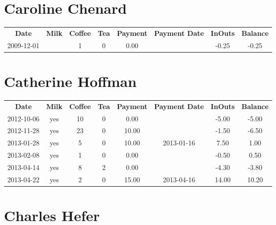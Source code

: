 \section{Caroline Chenard}

\begin{center}
\begin{tabular}{cccccccc}
\textbf{Date} & \textbf{Milk} & \textbf{Coffee} & \textbf{Tea} & \textbf{Payment} & \textbf{Payment Date} & \textbf{InOuts} & \textbf{Balance} \\
2009-12-01 &  & 1 & 0 & 0.00 &  & -0.25 & -0.25
\end{tabular}
\end{center}

\section{Catherine Hoffman}

\begin{center}
\begin{tabular}{cccccccc}
\textbf{Date} & \textbf{Milk} & \textbf{Coffee} & \textbf{Tea} & \textbf{Payment} & \textbf{Payment Date} & \textbf{InOuts} & \textbf{Balance} \\
2012-10-06 & yes & 10 & 0 &  0.00 &  & -5.00 & -5.00\\ 
2012-11-28 & yes & 23 & 0 & 10.00 &  & -1.50 & -6.50\\ 
2013-01-28 & yes &  5 & 0 & 10.00 & 2013-01-16 &  7.50 &  1.00\\ 
2013-02-08 & yes &  1 & 0 &  0.00 &  & -0.50 &  0.50\\ 
2013-04-14 & yes &  8 & 2 &  0.00 &  & -4.30 & -3.80\\ 
2013-04-22 & yes &  2 & 0 & 15.00 & 2013-04-16 & 14.00 & 10.20
\end{tabular}
\end{center}

\section{Charles Hefer}

